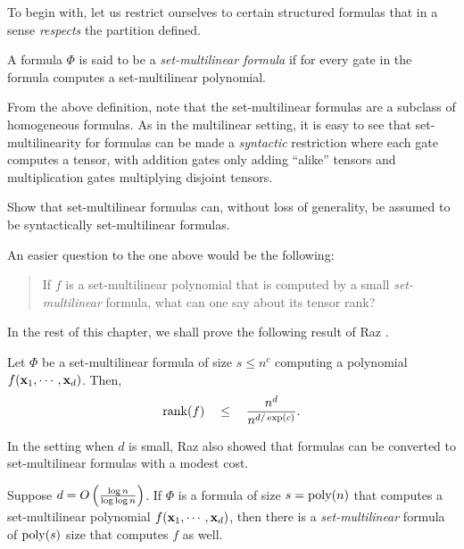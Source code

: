 To begin with, let us restrict ourselves to certain structured formulas that in a sense \emph{respects} the partition defined. 

\begin{definition} A formula $\Phi$ is said
  to be a \emph{set-multilinear formula} if for every gate in the formula computes a set-multilinear polynomial.
\end{definition}

From the above definition, note that the set-multilinear formulas are a subclass of homogeneous formulas.
As in the multilinear setting, it is easy to see that set-multilinearity for formulas can be made a \emph{syntactic} restriction where each gate computes a tensor, with addition gates only adding ``alike'' tensors and multiplication gates multiplying disjoint tensors.

\begin{exercise}
  Show that set-multilinear formulas can, without loss of generality, be assumed to be syntactically set-multilinear formulas.
\end{exercise}

\noindent
An easier question to the one above would be the following:

\begin{quote}
  If $f$ is a set-multilinear polynomial that is computed by a small \emph{set-multilinear} formula, what can one say about its tensor rank?
\end{quote}

In the rest of this chapter, we shall prove the following result of Raz \cite{raz10}. 

\begin{theorem} \label{thm:raz-tensorrank-sml} Let
  $\Phi$ be a set-multilinear formula of size $s \leq n^c$ computing a polynomial $f(\mathbf{x}_1,\cdots, \mathbf{x}_d)$.
Then,
\[
\operatorname{rank}(f) \quad \leq \quad \frac{n^d}{n^{d/\exp(c)}}. 
\] 
\end{theorem}

In the setting when $d$ is small, Raz \cite{raz10} also showed that formulas can be converted to set-multilinear formulas with a modest cost. 

\begin{theorem}\label{thm:form-to-smlform}
  Suppose $d = O\left(\frac{\log n}{\log\log n}\right)$.
If $\Phi$ is a formula of size $s = \operatorname{poly}(n)$ that computes a set-multilinear polynomial $f(\mathbf{x}_1,\cdots, \mathbf{x}_d)$, then there is a \emph{set-multilinear} formula of $\operatorname{poly}(s)$ size that computes $f$ as well.
\end{theorem}

